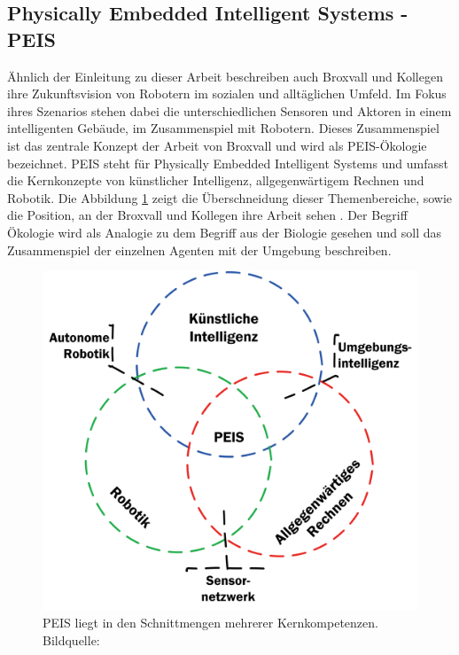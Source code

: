\subsection{Physically Embedded Intelligent Systems - PEIS}
\label{sec:relatedwork-peis}

Ähnlich der Einleitung zu dieser Arbeit beschreiben auch Broxvall und Kollegen ihre Zukunftsvision von Robotern im sozialen und alltäglichen Umfeld. Im Fokus ihres Szenarios stehen dabei die unterschiedlichen Sensoren und Aktoren in einem intelligenten Gebäude, im Zusammenspiel mit Robotern. Dieses Zusammenspiel ist das zentrale Konzept der Arbeit von Broxvall und wird als PEIS-Ökologie bezeichnet. PEIS steht für Physically Embedded Intelligent Systems und umfasst die Kernkonzepte von künstlicher Intelligenz, allgegenwärtigem Rechnen und Robotik. Die Abbildung \ref{fig:sota-peis} zeigt die Überschneidung dieser Themenbereiche, sowie die Position, an der Broxvall und Kollegen ihre Arbeit sehen \citep{Saffiotti:2005:PEA:1107548.1107615}. Der Begriff Ökologie wird als Analogie zu dem Begriff aus der Biologie gesehen und soll das Zusammenspiel der einzelnen Agenten mit der Umgebung beschreiben.


\begin{figure}[H]
	\centering
	\includegraphics[scale=0.6]{fig/peis}   
	\caption[Kompetenzen PEIS]{PEIS liegt in den Schnittmengen mehrerer Kernkompetenzen. Bildquelle: \cite{Saffiotti:2005:PEA:1107548.1107615}}
	\label{fig:sota-peis}
\end{figure}



